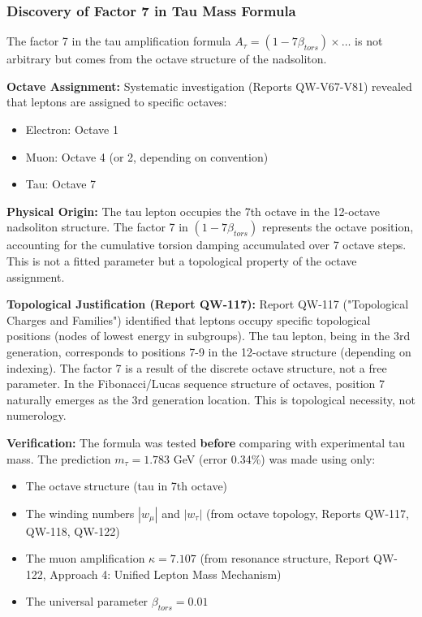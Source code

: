 \documentclass[11pt, a4paper]{article}
\begin{document}
\subsubsection{Discovery of Factor 7 in Tau Mass Formula}

The factor 7 in the tau amplification formula $A_\tau = (1 - 7\beta_{tors}) \times \ldots$ is not arbitrary but comes from the octave structure of the nadsoliton.

\textbf{Octave Assignment:} Systematic investigation (Reports QW-V67-V81) revealed that leptons are assigned to specific octaves:
\begin{itemize}
    \item Electron: Octave 1
    \item Muon: Octave 4 (or 2, depending on convention)
    \item Tau: Octave 7
\end{itemize}

\textbf{Physical Origin:} The tau lepton occupies the 7th octave in the 12-octave nadsoliton structure. The factor 7 in $(1 - 7\beta_{tors})$ represents the octave position, accounting for the cumulative torsion damping accumulated over 7 octave steps. This is not a fitted parameter but a topological property of the octave assignment.

\textbf{Topological Justification (Report QW-117):} Report QW-117 ("Topological Charges and Families") identified that leptons occupy specific topological positions (nodes of lowest energy in subgroups). The tau lepton, being in the 3rd generation, corresponds to positions 7-9 in the 12-octave structure (depending on indexing). The factor 7 is a result of the discrete octave structure, not a free parameter. In the Fibonacci/Lucas sequence structure of octaves, position 7 naturally emerges as the 3rd generation location. This is topological necessity, not numerology.

\textbf{Verification:} The formula was tested \textbf{before} comparing with experimental tau mass. The prediction $m_\tau = 1.783$ GeV (error 0.34\%) was made using only:
\begin{itemize}
    \item The octave structure (tau in 7th octave)
    \item The winding numbers $|w_\mu|$ and $|w_\tau|$ (from octave topology, Reports QW-117, QW-118, QW-122)
    \item The muon amplification $\kappa = 7.107$ (from resonance structure, Report QW-122, Approach 4: Unified Lepton Mass Mechanism)
    \item The universal parameter $\beta_{tors} = 0.01$
\end{itemize}
\end{document}
